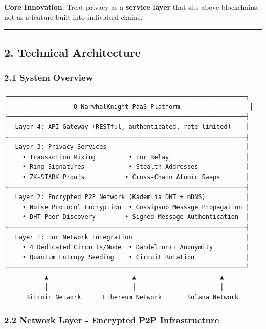 \documentclass[
  11pt,
]{article}
\begin{document}
\textbf{Core Innovation}: Treat privacy as a \textbf{service layer} that
sits above blockchains, not as a feature built into individual chains.

\begin{center}\rule{0.5\linewidth}{0.5pt}\end{center}

\hypertarget{technical-architecture}{%
\subsection{2. Technical Architecture}\label{technical-architecture}}

\hypertarget{system-overview}{%
\subsubsection{2.1 System Overview}\label{system-overview}}

\begin{verbatim}
┌─────────────────────────────────────────────────────────────────┐
│                  Q-NarwhalKnight PaaS Platform                   │
├─────────────────────────────────────────────────────────────────┤
│  Layer 4: API Gateway (RESTful, authenticated, rate-limited)    │
├─────────────────────────────────────────────────────────────────┤
│  Layer 3: Privacy Services                                      │
│    • Transaction Mixing         • Tor Relay                     │
│    • Ring Signatures            • Stealth Addresses             │
│    • ZK-STARK Proofs           • Cross-Chain Atomic Swaps       │
├─────────────────────────────────────────────────────────────────┤
│  Layer 2: Encrypted P2P Network (Kademlia DHT + mDNS)           │
│    • Noise Protocol Encryption  • Gossipsub Message Propagation │
│    • DHT Peer Discovery        • Signed Message Authentication  │
├─────────────────────────────────────────────────────────────────┤
│  Layer 1: Tor Network Integration                               │
│    • 4 Dedicated Circuits/Node  • Dandelion++ Anonymity         │
│    • Quantum Entropy Seeding    • Circuit Rotation              │
└─────────────────────────────────────────────────────────────────┘
           ▲                       ▲                       ▲
           │                       │                       │
      Bitcoin Network      Ethereum Network       Solana Network
\end{verbatim}

\hypertarget{network-layer---encrypted-p2p-infrastructure}{%
\subsubsection{2.2 Network Layer - Encrypted P2P
Infrastructure}\label{network-layer---encrypted-p2p-infrastructure}}
\end{document}
